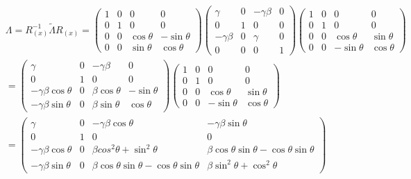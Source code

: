 \documentclass[10pt,a4paper]{article}
\begin{document}
\begin{enumerate}
\begin{equation} \label{boost arbitrário}
\begin{split}
&\Lambda = R_{(x)}^{-1}\tilde{\Lambda}R_{(x)} = \begin{pmatrix}
1 & 0 & 0 & 0 \\ 
0 & 1 & 0 & 0 \\ 
0 & 0 & \cos\theta & -\sin\theta \\ 
0 & 0 & \sin\theta & \cos\theta
\end{pmatrix} 
\begin{pmatrix}
\gamma & 0 & -\gamma \beta & 0 \\ 
0 & 1 & 0 & 0 \\ 
-\gamma \beta & 0 & \gamma & 0 \\ 
0 & 0 & 0 & 1
\end{pmatrix} \begin{pmatrix}
1 & 0 & 0 & 0 \\ 
0 & 1 & 0 & 0 \\ 
0 & 0 & \cos\theta & \sin\theta \\ 
0 & 0 & -\sin\theta & \cos\theta
\end{pmatrix} \\
&= \begin{pmatrix}
\gamma & 0 &  -\gamma \beta & 0 \\ 
0 & 1 & 0 & 0 \\ 
-\gamma \beta \cos\theta & 0 & \beta\cos\theta & -\sin\theta \\ 
-\gamma \beta \sin\theta & 0 & \beta \sin\theta & \cos\theta
\end{pmatrix} \begin{pmatrix}
1 & 0 & 0 & 0 \\ 
0 & 1 & 0 & 0 \\ 
0 & 0 & \cos\theta & \sin\theta \\ 
0 & 0 & -\sin\theta & \cos\theta
\end{pmatrix} \\
&= \begin{pmatrix}
\gamma & 0 & -\gamma \beta \cos\theta & -\gamma \beta \sin\theta \\ 
0 & 1 & 0 & 0 \\ 
-\gamma \beta \cos\theta & 0 & \beta cos^2\theta + \sin^2\theta & \beta \cos\theta \sin\theta-\cos\theta \sin\theta \\ 
-\gamma \beta \sin\theta & 0 & \beta\cos\theta \sin\theta - \cos\theta \sin\theta & \beta \sin^2\theta + \cos^2\theta
\end{pmatrix} 
\end{split}
\end{equation}


\end{enumerate}
\end{document}
